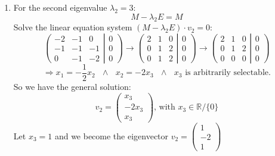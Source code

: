 \documentclass[a4paper]{article}
\begin{document}
\begin{enumerate}
                    \item For the second eigenvalue $\lambda_2 = 3$:\\
                            $$M - \lambda_2 E = M$$
                        Solve the linear equation system $(M - \lambda_2E) \cdot v_2 = 0$:
                            $$\left ( \begin{array}{ccc} -2 & -1 & 0 \\ -1 & -1 & -1 \\ 0 & -1 & -2 \end{array} \right | \left. \begin{array}{c} 0 \\ 0 \\ 0 \end{array}\right)
                            \rightarrow \left ( \begin{array}{ccc} 2 & 1 & 0 \\ 0 & 1 & 2 \\ 0 & 1 & 2 \end{array} \right | \left. \begin{array}{c} 0 \\ 0 \\ 0 \end{array}\right)
                            \rightarrow \left ( \begin{array}{ccc} 2 & 1 & 0 \\ 0 & 1 & 2 \\ 0 & 0 & 0 \end{array} \right | \left. \begin{array}{c} 0 \\ 0 \\ 0 \end{array}\right)$$
                            $$\Rightarrow x_1 = -\frac{1}{2} x_2\ \ \  \wedge\ \ \  x_2 = -2 x_3\ \ \  \wedge\ \ \  x_3 \text{ is arbitrarily selectable.}$$
                        So we have the general solution:
                            $$v_2 = \left( \begin{matrix} x_3 \\ -2 x_3 \\ x_3 \end{matrix} \right) \text{, with } x_3 \in \mathbb{R}/\{0\}$$
                        Let $x_3 = 1$ and we become the eigenvector $v_2 = \left( \begin{matrix} 1 \\ -2 \\ 1 \end{matrix} \right)$
                        

\end{enumerate}
\end{document}
